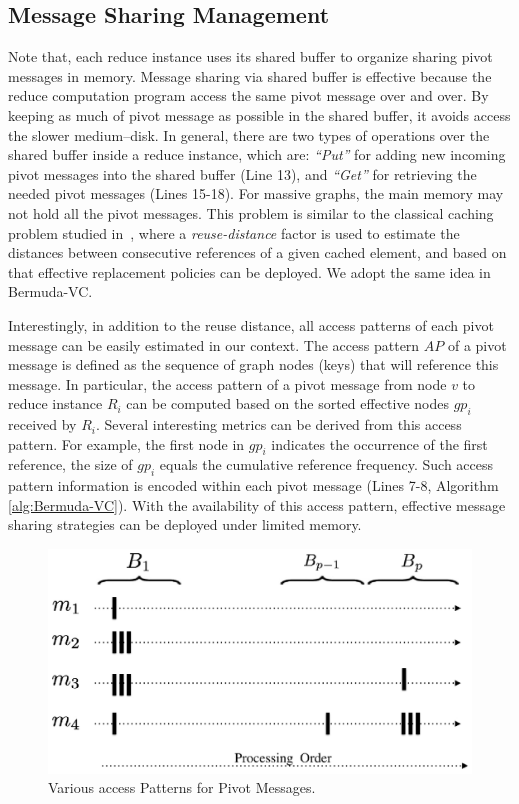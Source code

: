 \subsection{Message Sharing Management}
Note that, each reduce instance uses its shared buffer to organize sharing pivot messages in memory. Message sharing via shared buffer is effective because the reduce computation program access the same pivot message over and over. By keeping as much of  pivot message as possible in the shared buffer, it avoids access the slower medium--disk. 
In general, there are two types of operations over the shared buffer inside a reduce instance, which are: {\em ``Put''} for adding new incoming pivot messages into the shared buffer (Line 13), and {\em ``Get''} for retrieving  the needed pivot messages (Lines 15-18).  For massive graphs, the main memory may not hold all the pivot messages.  
This problem is similar to the classical caching problem studied in~\cite{keramidascache2007, petoumenos2009}, where a {\em  reuse-distance} factor is used to estimate the distances between consecutive references of a given cached element, and based on that effective  replacement policies can be deployed. We adopt the same idea in  Bermuda-VC.

Interestingly, in addition to the reuse distance, all access patterns of each pivot message can be easily estimated in our context.
The access pattern $AP$ of a pivot message is defined as the sequence of graph nodes (keys) that will reference this message. 
In particular, the access pattern of a pivot message from node $v$ to reduce instance $R_i$ can be computed based on the sorted effective nodes $gp_i$ received by $R_i$. Several interesting metrics can be derived from this access pattern. 
For example, the first node in $gp_i$ indicates the occurrence of the first reference, the size of $gp_i$ equals the cumulative reference frequency. 
Such access pattern information is encoded within each pivot message (Lines 7-8, Algorithm \ref{alg:Bermuda-VC}). 
With the availability of this access pattern, effective message sharing strategies can be deployed under limited memory.  

\begin{figure}[t]
		\centering	
		\includegraphics[scale=0.4]{figures/bermuda/usagePattern.eps}
		\caption {Various access Patterns for Pivot Messages.}
		\label{fig:upattern}
\end{figure}

